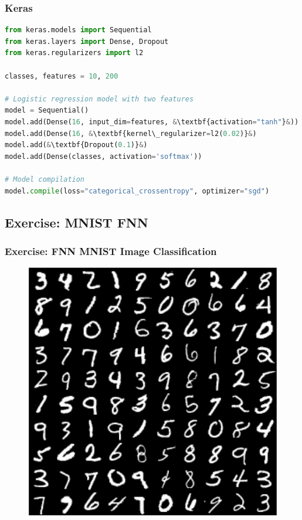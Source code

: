 \documentclass[aspectratio=169]{beamer}
\begin{document}
\begin{frame}
\begin{columns}
\begin{column}{0.48\textwidth}
\begin{figure}
        \end{figure}
    \end{column}
\end{columns}
\end{frame}

\begin{frame}[fragile]
\frametitle{Keras}

\begin{lstlisting}[language=Python]
from keras.models import Sequential
from keras.layers import Dense, Dropout
from keras.regularizers import l2

classes, features = 10, 200

# Logistic regression model with two features
model = Sequential()
model.add(Dense(16, input_dim=features, &\textbf{activation="tanh"}&))
model.add(Dense(16, &\textbf{kernel\_regularizer=l2(0.02)}&)
model.add(&\textbf{Dropout(0.1)}&)
model.add(Dense(classes, activation='softmax'))

# Model compilation
model.compile(loss="categorical_crossentropy", optimizer="sgd")
\end{lstlisting}

\end{frame}

\subsection{Exercise: MNIST FNN}
\label{subsec:exercise-fnn}

\begin{frame}
    \frametitle{Exercise: FNN MNIST Image Classification}
    
    \begin{figure}
        \centering
        \includegraphics[width=0.4\linewidth]{mnist.png}
    \end{figure}
\end{frame}
\end{document}
